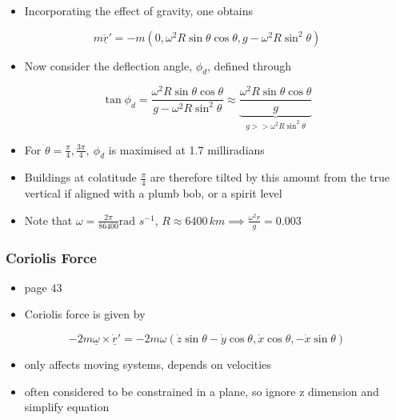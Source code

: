 \documentclass[a4paper,11pt,normalem]{article}
\begin{document}
\begin{itemize}
\item
  Incorporating the effect of gravity, one obtains
\end{itemize}

\[
    m\underline{\ddot{r}}' = -m(0, \omega^2R\sin\theta\cos\theta, g - \omega^2R\sin^2\theta)
\]

\begin{itemize}
\item
  Now consider the deflection angle, \(\phi_d\), defined through
\end{itemize}

\[
    \tan\phi_d = \frac{\omega^2R\sin\theta\cos\theta}{g - \omega^2R\sin^2\theta} \approx \underbrace{\frac{\omega^2R\sin\theta\cos\theta}{g}}_{g >> \omega^2R\sin^2\theta}
\]

\begin{itemize}
\item
  For \(\theta = \frac{\pi}{4}, \frac{3\pi}{4},~ \phi_d\) is maximised
  at 1.7 milliradians
\item
  Buildings at colatitude \(\frac{\pi}{4}\) are therefore tilted by this
  amount from the true vertical if aligned with a plumb bob, or a spirit
  level
\item
  Note that \(\omega = \frac{2\pi}{86400} \text{rad }s^{-1}\),
  \(R \approx 6400\,km \implies \frac{\omega^2 r}{g} = 0.003\)
\end{itemize}

\subsubsection{Coriolis Force}\label{coriolis-force}

\begin{itemize}
\item
  page 43
\item
  Coriolis force is given by
\end{itemize}

\[
    -2m\underline{\omega} \times \underline{\dot{r}}' = -2m\omega(\dot{z}\sin\theta - \dot{y}\cos\theta, \dot{x}\cos\theta, -\dot{x}\sin\theta)
\]

\begin{itemize}
\item
  only affects moving systems, depends on velocities
\item
  often considered to be constrained in a plane, so ignore z dimension
  and simplify equation
\end{itemize}
\end{document}
